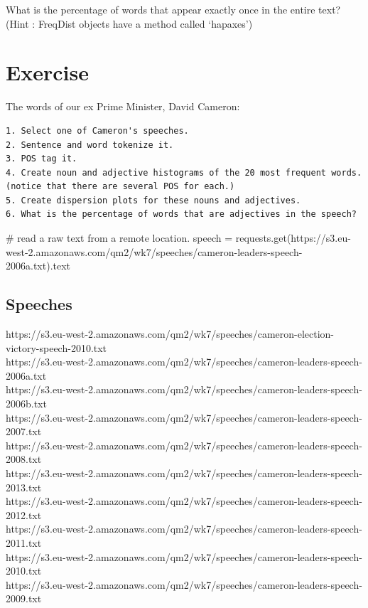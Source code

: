 \documentclass[
  letterpaper,
  DIV=11,
  numbers=noendperiod]{scrreprt}
\newenvironment{Shaded}{\begin{snugshade}}{\end{snugshade}}
\newcommand{\CommentTok}[1]{\textcolor[rgb]{0.37,0.37,0.37}{#1}}
\newcommand{\NormalTok}[1]{\textcolor[rgb]{0.00,0.23,0.31}{#1}}
\newcommand{\OperatorTok}[1]{\textcolor[rgb]{0.37,0.37,0.37}{#1}}
\newcommand{\StringTok}[1]{\textcolor[rgb]{0.13,0.47,0.30}{#1}}
\begin{document}
What is the percentage of words that appear exactly once in the entire
text? (Hint : FreqDist objects have a method called `hapaxes')

\hypertarget{exercise-11}{%
\section{Exercise}\label{exercise-11}}

The words of our ex Prime Minister, David Cameron:

\begin{verbatim}
1. Select one of Cameron's speeches.
2. Sentence and word tokenize it.
3. POS tag it.
4. Create noun and adjective histograms of the 20 most frequent words.
(notice that there are several POS for each.)
5. Create dispersion plots for these nouns and adjectives. 
6. What is the percentage of words that are adjectives in the speech?
\end{verbatim}

\begin{Shaded}
\begin{Highlighting}[]
\CommentTok{\# read a raw text from a remote location. }
\NormalTok{speech }\OperatorTok{=}\NormalTok{ requests.get(}\StringTok{\textquotesingle{}https://s3.eu{-}west{-}2.amazonaws.com/qm2/wk7/speeches/cameron{-}leaders{-}speech{-}2006a.txt\textquotesingle{}}\NormalTok{).text}
\end{Highlighting}
\end{Shaded}

\hypertarget{speeches}{%
\subsection{Speeches}\label{speeches}}

https://s3.eu-west-2.amazonaws.com/qm2/wk7/speeches/cameron-election-victory-speech-2010.txt\\
https://s3.eu-west-2.amazonaws.com/qm2/wk7/speeches/cameron-leaders-speech-2006a.txt\\
https://s3.eu-west-2.amazonaws.com/qm2/wk7/speeches/cameron-leaders-speech-2006b.txt\\
https://s3.eu-west-2.amazonaws.com/qm2/wk7/speeches/cameron-leaders-speech-2007.txt\\
https://s3.eu-west-2.amazonaws.com/qm2/wk7/speeches/cameron-leaders-speech-2008.txt\\
https://s3.eu-west-2.amazonaws.com/qm2/wk7/speeches/cameron-leaders-speech-2013.txt\\
https://s3.eu-west-2.amazonaws.com/qm2/wk7/speeches/cameron-leaders-speech-2012.txt\\
https://s3.eu-west-2.amazonaws.com/qm2/wk7/speeches/cameron-leaders-speech-2011.txt\\
https://s3.eu-west-2.amazonaws.com/qm2/wk7/speeches/cameron-leaders-speech-2010.txt\\
https://s3.eu-west-2.amazonaws.com/qm2/wk7/speeches/cameron-leaders-speech-2009.txt
\end{document}
